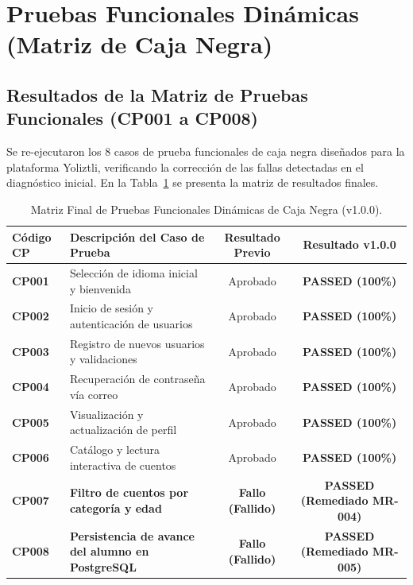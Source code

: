 \documentclass[12pt]{article}
\begin{document}
\section{Pruebas Funcionales Dinámicas (Matriz de Caja Negra)}

\subsection{Resultados de la Matriz de Pruebas Funcionales (CP001 a CP008)}
Se re-ejecutaron los 8 casos de prueba funcionales de caja negra diseñados para la plataforma Yoliztli, verificando la corrección de las fallas detectadas en el diagnóstico inicial. En la Tabla~\ref{tab:functional_tests} se presenta la matriz de resultados finales.

\begin{table}[H]
    \centering
    \caption{Matriz Final de Pruebas Funcionales Dinámicas de Caja Negra (v1.0.0).}
    \label{tab:functional_tests}
    \small
    \color{black}
    \begin{tabularx}{\textwidth}{lXcc}
        \toprule
        \textbf{Código CP} & \textbf{Descripción del Caso de Prueba} & \textbf{Resultado Previo} & \textbf{Resultado v1.0.0} \\
        \midrule
        \textbf{CP001} & Selección de idioma inicial y bienvenida & Aprobado & \textbf{PASSED (100\%)} \\
        \rowcolor{darkcard}
        \textbf{CP002} & Inicio de sesión y autenticación de usuarios & Aprobado & \textbf{PASSED (100\%)} \\
        \textbf{CP003} & Registro de nuevos usuarios y validaciones & Aprobado & \textbf{PASSED (100\%)} \\
        \rowcolor{darkcard}
        \textbf{CP004} & Recuperación de contraseña vía correo & Aprobado & \textbf{PASSED (100\%)} \\
        \textbf{CP005} & Visualización y actualización de perfil & Aprobado & \textbf{PASSED (100\%)} \\
        \rowcolor{darkcard}
        \textbf{CP006} & Catálogo y lectura interactiva de cuentos & Aprobado & \textbf{PASSED (100\%)} \\
        \textbf{CP007} & \textbf{Filtro de cuentos por categoría y edad} & \textbf{Fallo (Fallido)} & \textbf{PASSED (Remediado MR-004)} \\
        \rowcolor{darkcard}
        \textbf{CP008} & \textbf{Persistencia de avance del alumno en PostgreSQL} & \textbf{Fallo (Fallido)} & \textbf{PASSED (Remediado MR-005)} \\
        \bottomrule
    \end{tabularx}
\end{table}
\end{document}
